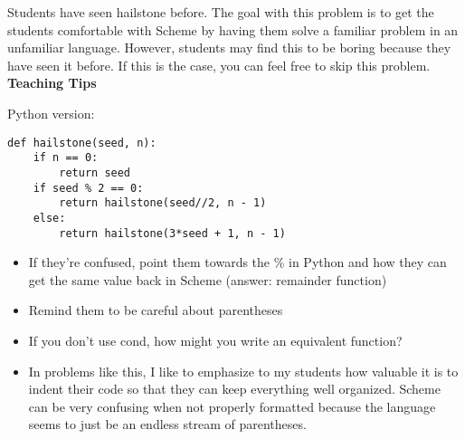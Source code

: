 \begin{guide}
\begin{blocksection}
Students have seen hailstone before. The goal with this problem is to get the students comfortable with Scheme by having them solve a familiar problem in an unfamiliar language. However, students may find this to be boring because they have seen it before. If this is the case, you can feel free to skip this problem. 
\textbf{Teaching Tips}

Python version:
\begin{lstlisting}
def hailstone(seed, n):
    if n == 0:
        return seed
    if seed % 2 == 0:
        return hailstone(seed//2, n - 1)
    else:
        return hailstone(3*seed + 1, n - 1)
\end{lstlisting}
\begin{itemize}
    \item If they’re confused, point them towards the \% in Python and how they can get the same value back in Scheme (answer: remainder function) 
    \item Remind them to be careful about parentheses
    \item If you don’t use cond, how might you write an equivalent function? 
    \item In problems like this, I like to emphasize to my students how valuable it is to indent their code so that they can keep everything well organized. Scheme can be very confusing when not properly formatted because the language seems to just be an endless stream of parentheses. 
\end{itemize}
\end{blocksection}
\end{guide}
